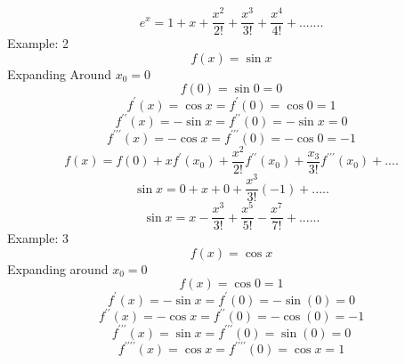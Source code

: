 \begin{displaymath}
e^x = 1 + x+\frac{x^2}{2!}+\frac{x^3}{3!}+\frac{x^4}{4!}+.......
\end{displaymath}
\newline
Example: 2
\begin{displaymath}
f(x) = \sin x
\end{displaymath}
Expanding Around $ x_0 = 0 $
\begin{displaymath}
f(0) = \sin 0 = 0
\end{displaymath}
\begin{displaymath}
f^\prime(x)=\cos x =f^\prime(0)=\cos 0 = 1
\end{displaymath}
\begin{displaymath}
f^{\prime\prime}(x)=-\sin x = f^{\prime\prime}(0)= -\sin x = 0
\end{displaymath}
\begin{displaymath}
f^{\prime\prime\prime}(x)=-\cos x = f^{\prime\prime\prime}(0)=-\cos 0 = -1
\end{displaymath}
\begin{displaymath}
f(x)=f(0)+xf^\prime(x_0)+\frac{x^2}{2!}f^{\prime\prime}(x_0)+\frac{x_3}{3!}f^{\prime\prime\prime}(x_0)+....
\end{displaymath}
\begin{displaymath}
\sin x = 0+x+0+\frac{x^3}{3!}(-1)+.....
\end{displaymath}
\begin{displaymath}
\sin x = x-\frac{x^3}{3!}+\frac{x^5}{5!}-\frac{x^7}{7!}+......
\end{displaymath}
\newline
Example: 3
\begin{displaymath}
f(x)= \cos x
\end{displaymath}
Expanding around $ x_0=0 $
\begin{displaymath}
f(x) = \cos 0 = 1
\end{displaymath}
\begin{displaymath}
f^\prime(x) = -\sin x = f^\prime(0)=-\sin(0) = 0
\end{displaymath}
\begin{displaymath}
f^{\prime\prime}(x) = - \cos x = f^{\prime\prime}(0)= -\cos(0) = -1
\end{displaymath}
\begin{displaymath}
f^{\prime\prime\prime}(x)= \sin x = f^{\prime\prime\prime}(0)=\sin(0)= 0
\end{displaymath}
\begin{displaymath}
f^{\prime\prime\prime\prime}(x)= \cos x = f^{\prime\prime\prime\prime}(0)=\cos x = 1
\end{displaymath}
